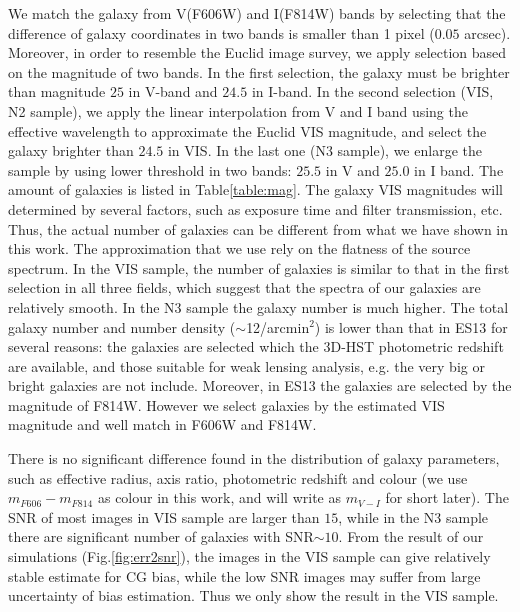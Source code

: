 \documentclass[useAMS,usenatbib]{mn2e}
\begin{document}
We match the galaxy from V(F606W) and I(F814W) bands by selecting that
the difference of galaxy coordinates in two bands is smaller than 1
pixel ($0.05$ arcsec). Moreover, in order to resemble the Euclid image
survey, we apply selection based on the magnitude of two bands. In the
first selection, the galaxy must be brighter than magnitude $25$ in
V-band and $24.5$ in I-band. In the second selection (VIS, N2 sample),
we apply the linear interpolation from V and I band using the
effective wavelength to approximate the Euclid VIS magnitude, and
select the galaxy brighter than $24.5$ in VIS. In the last one (N3
sample), we enlarge the sample by using lower threshold in two bands:
$25.5$ in V and $25.0$ in I band. The amount of galaxies is listed in
Table\ref{table:mag}.
%
The galaxy VIS magnitudes will determined by several factors, such as
exposure time and filter transmission, etc. Thus, the actual number of
galaxies can be different from what we have shown in this work. The
approximation that we use rely on the flatness of the source
spectrum. In the VIS sample, the number of galaxies is similar to that in
the first selection in all three fields, which suggest that the
spectra of our galaxies are relatively smooth. In the N3 sample the galaxy
number is much higher.
%
The total galaxy number and number density ($\sim$12/arcmin$^2$) is
lower than that in ES13 for several reasons: the galaxies are selected
which the 3D-HST photometric redshift are available, and those
suitable for weak lensing analysis, e.g. the very big or bright
galaxies are not include. Moreover, in ES13 the galaxies are selected
by the magnitude of F814W. However we select galaxies by the estimated
VIS magnitude and well match in F606W and F814W.

There is no significant difference found in the distribution of galaxy
parameters, such as effective radius, axis ratio, photometric redshift
and colour (we use $m_{F606}-m_{F814}$ as colour in this work, and
will write as $m_{V-I}$ for short later). The SNR of most images in VIS sample
are larger than $15$, while in the N3 sample there are significant number
of galaxies with SNR$\sim10$. From the result of our simulations
(Fig.\ref{fig:err2snr}), the images in the VIS sample can give relatively
stable estimate for CG bias, while the low SNR images may suffer from
large uncertainty of bias estimation. Thus we only show the result in
the VIS sample.
\end{document}
